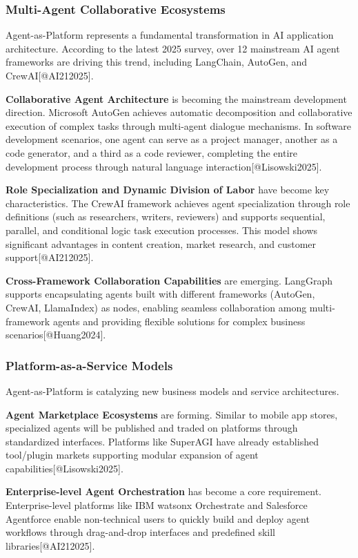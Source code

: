 \documentclass{article}
\begin{document}
\subsubsection{Multi-Agent Collaborative Ecosystems}
Agent-as-Platform represents a fundamental transformation in AI application architecture. According to the latest 2025 survey, over 12 mainstream AI agent frameworks are driving this trend, including LangChain, AutoGen, and CrewAI[@AI212025].

\textbf{Collaborative Agent Architecture} is becoming the mainstream development direction. Microsoft AutoGen achieves automatic decomposition and collaborative execution of complex tasks through multi-agent dialogue mechanisms. In software development scenarios, one agent can serve as a project manager, another as a code generator, and a third as a code reviewer, completing the entire development process through natural language interaction[@Lisowski2025].

\textbf{Role Specialization and Dynamic Division of Labor} have become key characteristics. The CrewAI framework achieves agent specialization through role definitions (such as researchers, writers, reviewers) and supports sequential, parallel, and conditional logic task execution processes. This model shows significant advantages in content creation, market research, and customer support[@AI212025].

\textbf{Cross-Framework Collaboration Capabilities} are emerging. LangGraph supports encapsulating agents built with different frameworks (AutoGen, CrewAI, LlamaIndex) as nodes, enabling seamless collaboration among multi-framework agents and providing flexible solutions for complex business scenarios[@Huang2024].

\subsubsection{Platform-as-a-Service Models}
Agent-as-Platform is catalyzing new business models and service architectures.

\textbf{Agent Marketplace Ecosystems} are forming. Similar to mobile app stores, specialized agents will be published and traded on platforms through standardized interfaces. Platforms like SuperAGI have already established tool/plugin markets supporting modular expansion of agent capabilities[@Lisowski2025].

\textbf{Enterprise-level Agent Orchestration} has become a core requirement. Enterprise-level platforms like IBM watsonx Orchestrate and Salesforce Agentforce enable non-technical users to quickly build and deploy agent workflows through drag-and-drop interfaces and predefined skill libraries[@AI212025].
\end{document}
